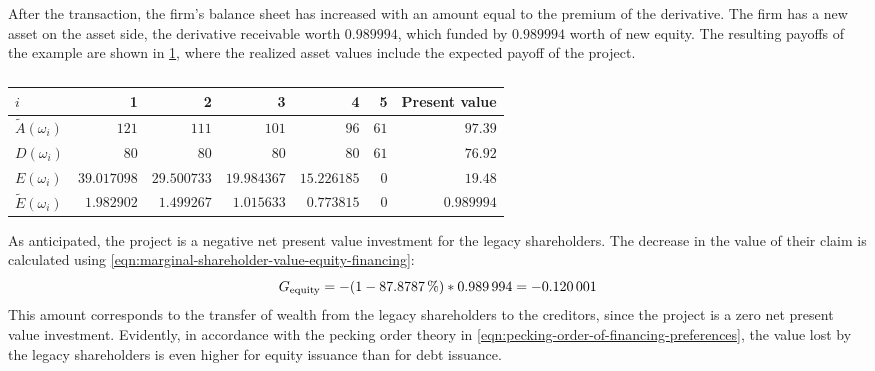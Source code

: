 \documentclass[main.tex]{subfiles}
\begin{document}
        After the transaction, the firm's balance sheet has increased with an amount equal to the premium of the derivative. 
        The firm has a new asset on the asset side, the derivative receivable worth $\num{0.989994}$, which funded by $\num{0.989994}$ worth of new equity.
        The resulting payoffs of the example are shown in \cref{tbl:equity-funding-payoff},
        where the realized asset values include the expected payoff of the project.
        \begin{table}[H]
            \centering\begin{tabular}{l|rrrrr||r}
                $i$ & 1 & 2 & 3 & 4 & 5 & Present value \\
                \hline
                \rule{0pt}{1.1em}
                $\tilde{A}(\omega_{i})$ & $\num{121}$ & $\num{111}$ & $\num{101}$ & $\num{96}$ & $\num{61}$ & $\num{97.39}$ \\
                $D(\omega_{i})$ & $\num{80}$ & $\num{80}$ & $\num{80}$ & $\num{80}$ & $\num{61}$ & $\num{76.92}$ \\
                $E(\omega_{i})$ & $\num{39.017098}$ & $\num{29.500733}$ & $\num{19.984367}$ & $\num{15.226185}$ & $\num{0}$ & $\num{19.48}$ \\
                $\tilde{E}(\omega_{i})$ & $\num{1.982902}$ & $\num{1.499267}$ & $\num{1.015633}$ & $\num{0.773815}$ & $\num{0}$ & $\num{0.989994}$ \\
            \end{tabular}
            \caption{}
            \label{tbl:equity-funding-payoff}
        \end{table}

        As anticipated,
        the project is a negative net present value investment for the legacy shareholders. 
        The decrease in the value of their claim is calculated using
        \cref{eqn:marginal-shareholder-value-equity-financing}:
        \begin{equation*}
                G_{\text{equity}}
            =
                - (\num{1} - \pct{0.878787}) * \num{0.989994}
            = 
                -\num{0.120001}
        \end{equation*}
        This amount corresponds to the transfer of wealth 
        from the legacy shareholders to the creditors,
        since the project is a zero net present value investment.
        Evidently, in accordance with the pecking order theory in 
        \cref{eqn:pecking-order-of-financing-preferences},
        the value lost by the legacy shareholders 
        is even higher for equity issuance than for debt issuance.
\end{document}
